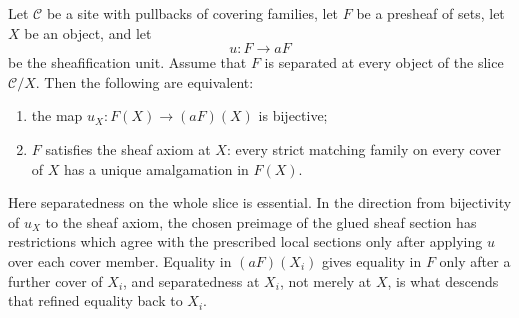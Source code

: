 \begin{lemma}\label{lem:bijective-unit-terminal-sheaf-axiom}
Let $\mathcal C$ be a site with pullbacks of covering families, let $F$
be a presheaf of sets, let $X$ be an object, and let
\[
u:F\longrightarrow aF
\]
be the sheafification unit. Assume that \(F\) is separated at every object
of the slice \(\mathcal C/X\). Then the following are equivalent:
\begin{enumerate}[label=(\alph*),nosep]
\item the map \(u_X:F(X)\to(aF)(X)\) is bijective;
\item \(F\) satisfies the sheaf axiom at \(X\): every strict matching
family on every cover of \(X\) has a unique amalgamation in \(F(X)\).
\end{enumerate}
Here separatedness on the whole slice is essential.  In the direction from
bijectivity of \(u_X\) to the sheaf axiom, the chosen preimage of the
glued sheaf section has restrictions which agree with the prescribed
local sections only after applying \(u\) over each cover member.  Equality
in \((aF)(X_i)\) gives equality in \(F\) only after a further cover of
\(X_i\), and separatedness at \(X_i\), not merely at \(X\), is what
descends that refined equality back to \(X_i\).
\end{lemma}

